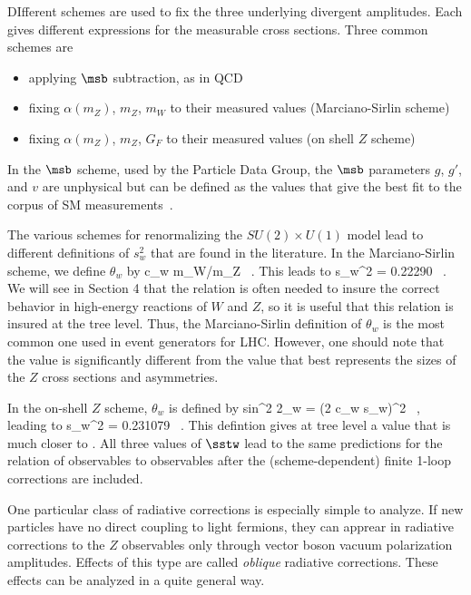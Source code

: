 \documentclass[12pt]{article}
\begin{document}
DIfferent schemes are used to fix the three underlying divergent
amplitudes.  Each gives different expressions for the measurable cross
sections.  Three common schemes are
\begin{itemize}
\item  applying $\msb$ subtraction, as in QCD
\item  fixing $\alpha(m_Z)$, $m_Z$, $m_W$ to their measured values
  (Marciano-Sirlin scheme)~\cite{MarcianoSirlin}
\item  fixing $\alpha(m_Z)$, $m_Z$, $G_F$   to their measured values
  (on shell $Z$ scheme)
\end{itemize}
In the $\msb$ scheme, used by the Particle Data Group, the
$\msb$ parameters $g$, $g'$, and $v$ are unphysical but can be
defined as the values that give the best fit to the corpus of 
SM measurements~\cite{PDGweak}.  

The various schemes for renormalizing the $SU(2)\times U(1)$ model
lead to different definitions of $s_w^2$ that are found in the
literature.  In the Marciano-Sirlin scheme, we define $\theta_w$ by 
\beq
    c_w \equiv  m_W/m_Z  \ . 
This leads to 
\beq
    s_w^2 = 0.22290  \ .
We will see in Section 4 that the relation  is often needed
to insure the correct behavior in high-energy reactions of $W$ and
$Z$, so it is useful that this relation is insured at the tree level.
 Thus, the Marciano-Sirlin definition of $\theta_w$ is the most common
 one used in event generators for LHC.    However, one should note
 that the value  is significantly different from
 the value  that best represents the sizes of the $Z$
 cross sections and asymmetries.

In the on-shell $Z$ scheme, $\theta_w$ is defined by 
\beq
   sin^2 2\theta_w  = (2 c_w s_w)^2 \ , \ 
\eeqn
leading to 
\beq
    s_w^2 = 0.231079  \ .
\eeqn
 This defintion gives at  tree level a value that is much closer to
 \leqn{refsstw}.   All three values of  $\sstw$
 lead to the same predictions for the relation of observables to
 observables after the (scheme-dependent)  finite 1-loop corrections are
 included.

One particular class of radiative corrections is especially simple to
analyze.  If new particles have no direct coupling to light fermions,
they can apprear in radiative corrections to the $Z$ observables only
through vector boson vacuum polarization amplitudes.  Effects of this
type are called {\it oblique} radiative corrections.   These effects
can be analyzed in a quite general way.
\end{document}

